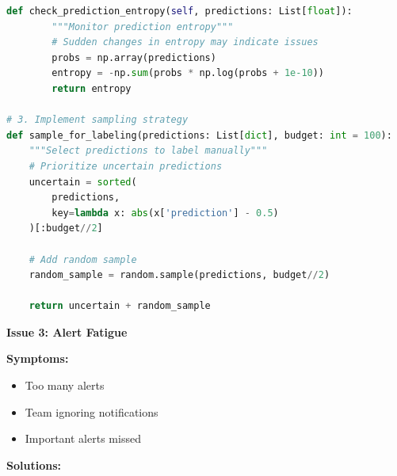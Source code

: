 \begin{lstlisting}[language=Python]
    def check_prediction_entropy(self, predictions: List[float]):
        """Monitor prediction entropy"""
        # Sudden changes in entropy may indicate issues
        probs = np.array(predictions)
        entropy = -np.sum(probs * np.log(probs + 1e-10))
        return entropy

# 3. Implement sampling strategy
def sample_for_labeling(predictions: List[dict], budget: int = 100):
    """Select predictions to label manually"""
    # Prioritize uncertain predictions
    uncertain = sorted(
        predictions,
        key=lambda x: abs(x['prediction'] - 0.5)
    )[:budget//2]

    # Add random sample
    random_sample = random.sample(predictions, budget//2)

    return uncertain + random_sample
\end{lstlisting}

\textbf{Issue 3: Alert Fatigue}

\textbf{Symptoms:}
\begin{itemize}
    \item Too many alerts
    \item Team ignoring notifications
    \item Important alerts missed
\end{itemize}

\textbf{Solutions:}

